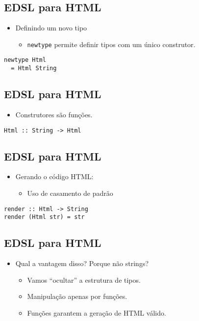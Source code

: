 \documentclass[11pt]{article}
\begin{document}
\subsection*{EDSL para HTML}
\label{sec:org938b239}

\begin{itemize}
\item Definindo um novo tipo
\begin{itemize}
\item \texttt{newtype} permite definir tipos com um único construtor.
\end{itemize}
\end{itemize}

\begin{verbatim}
newtype Html
  = Html String
\end{verbatim}
\subsection*{EDSL para HTML}
\label{sec:orgca58563}

\begin{itemize}
\item Construtores são funções.
\end{itemize}

\begin{verbatim}
Html :: String -> Html
\end{verbatim}
\subsection*{EDSL para HTML}
\label{sec:org0d3b88e}

\begin{itemize}
\item Gerando o código HTML:
\begin{itemize}
\item Uso de casamento de padrão
\end{itemize}
\end{itemize}

\begin{verbatim}
render :: Html -> String
render (Html str) = str
\end{verbatim}
\subsection*{EDSL para HTML}
\label{sec:org76e739c}

\begin{itemize}
\item Qual a vantagem disso? Porque não strings?
\begin{itemize}
\item Vamos ``ocultar'' a estrutura de tipos.
\item Manipulação apenas por funções.
\item Funções garantem a geração de HTML válido.
\end{itemize}
\end{itemize}
\end{document}
